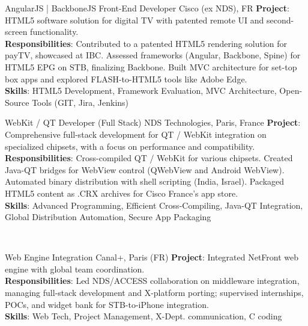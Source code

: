 \documentclass[
  a4paper,
   maincolor=cvblue,
   sectioncolor=cvblue,
]{fortysecondscv}
\begin{document}
\begin{cvtable}
    {AngularJS | BackboneJS Front-End Developer}
    {Cisco (ex NDS), FR}
    {
      \textbf{Project}: HTML5 software solution for digital TV with patented remote UI and second-screen functionality.\\
      \textbf{Responsibilities}:
          Contributed to a patented HTML5 rendering solution for payTV, showcased at IBC. Assessed frameworks (Angular, Backbone, Spine) for HTML5 EPG on STB, finalizing Backbone. Built MVC architecture for set-top box apps and explored FLASH-to-HTML5 tools like Adobe Edge.\\
      \textbf{Skills}: HTML5 Development, Framework Evaluation, MVC Architecture, Open-Source Tools (GIT, Jira, Jenkins)\\
    }
\end{cvtable}


\begin{cvtable}
    {WebKit / QT Developer (Full Stack)}
    {NDS Technologies, Paris, France}
    {
      \textbf{Project}: Comprehensive full-stack development for QT / WebKit integration on specialized chipsets, with a focus on performance and compatibility.\\
      \textbf{Responsibilities}:
          Cross-compiled QT / WebKit for various chipsets. Created Java-QT bridges for WebView control (QWebView and Android WebView). Automated binary distribution with shell scripting (India, Israel). Packaged HTML5 content as .CRX archives for Cisco France’s app store.\\
      \textbf{Skills}: Advanced Programming, Efficient Cross-Compiling, Java-QT Integration, Global Distribution Automation, Secure App Packaging\\
    }
\end{cvtable}
\\
\begin{cvtable}
    {Web Engine Integration}
    {Canal+, Paris (FR)}
    {
      \textbf{Project}: Integrated NetFront web engine with global team coordination.\\
      \textbf{Responsibilities}:
          Led NDS/ACCESS collaboration on middleware integration, managing full-stack development and X-platform porting; supervised internships, POCs, and widget bank for STB-to-iPhone integration.\\
      \textbf{Skills}: Web Tech, Project Management, X-Dept. communication, C coding\\
    }
\end{cvtable}
\end{document}

